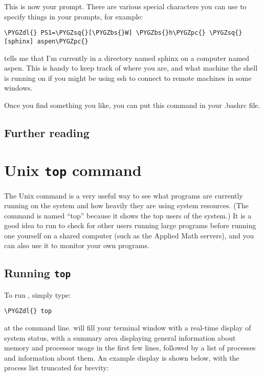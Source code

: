 \documentclass[letterpaper,10pt,english]{sphinxmanual}
\def\PYGZbs{\char`\\}
\def\PYGZpc{\char`\%}
\def\PYGZdl{\char`\$}
\def\PYGZsq{\char`\'}
\renewcommand\PYGZsq{\textquotesingle}
\begin{document}
This is now your prompt.  There are various special characters you can use
to specify things in your prompts, for example:

\begin{Verbatim}[commandchars=\\\{\}]
\PYGZdl{} PS1=\PYGZsq{}[\PYGZbs{}W] \PYGZbs{}h\PYGZpc{} \PYGZsq{}
[sphinx] aspen\PYGZpc{}
\end{Verbatim}

tells me that I'm currently in a directory named sphinx on a computer named
aspen.  This is handy to keep track of where you are, and what machine the
shell is running on if you might be using ssh to connect to remote machines
in some windows.

Once you find something you like, you can put this command in your .bashrc
file.


\subsection{Further reading}
\label{unix:further-reading}
\label{unix:id7}{\hyperref[biblio:wikipedia\string-unix\string-utilities]{}}


\section{Unix \texttt{top} command}
\label{top:unix-top-command}\label{top:topcommand}\label{top::doc}
The Unix  command is a very useful way to see what programs are
currently running on the system and how heavily they are using system
resources.  (The command is named ``top'' because it shows the top users
of the system.)  It is a good idea to run  to check for other
users running large programs before running one yourself on a shared
computer (such as the Applied Math servers), and you can also use it
to monitor your own programs.


\subsection{Running \texttt{top}}
\label{top:running-top}
To run , simply type:

\begin{Verbatim}[commandchars=\\\{\}]
\PYGZdl{} top
\end{Verbatim}

at the command line.   will fill your terminal window with a
real-time display of system status, with a summary area displaying
general information about memory and processor usage in the first few
lines, followed by a list of processes and information about them.  An
example display is shown below, with the process list truncated for
brevity:
\end{document}
